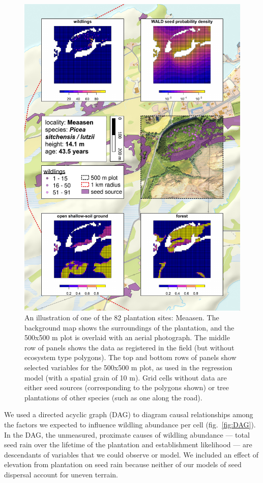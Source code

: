 \documentclass[
]{article}
\begin{document}
\begin{figure}
\includegraphics[width=0.9\linewidth]{figures/site-example/site-example} \caption{An illustration of one of the 82 plantation sites: Meaasen. The background map shows the surroundings of the plantation, and the 500x500 m plot is overlaid with an aerial photograph. The middle row of panels shows the data as registered in the field (but without ecosystem type polygons). The top and bottom rows of panels show selected variables for the 500x500 m plot, as used in the regression model (with a spatial grain of 10 m). Grid cells without data are either seed sources (corresponding to the polygons shown) or tree plantations of other species (such as one along the road).}\label{fig:site-example}
\end{figure}

We used a directed acyclic graph (DAG) to diagram causal relationships among the factors we expected to influence wildling abundance per cell (fig.~\ref{fig:DAG}).
In the DAG, the unmeasured, proximate causes of wildling abundance --- total seed rain over the lifetime of the plantation and establishment likelihood --- are descendants of variables that we could observe or model.
We included an effect of elevation from plantation on seed rain because neither of our models of seed dispersal account for uneven terrain.
\end{document}

